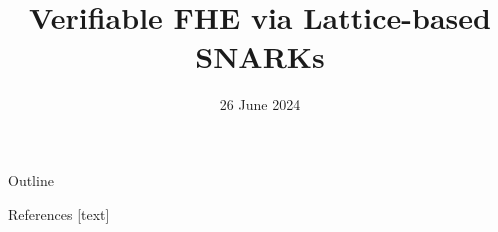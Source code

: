 \documentclass{beamer}
\title{Verifiable FHE via Lattice-based SNARKs}
\date{26 June 2024}
\begin{document}
	\begin{frame}
		\titlepage
	\end{frame}
	
	\begin{frame}{Outline}
		\tableofcontents
	\end{frame}
	
	
	
	
	
	
	
	\begin{frame}[allowframebreaks]{References}
		
		
		
	\end{frame}
\end{document}
